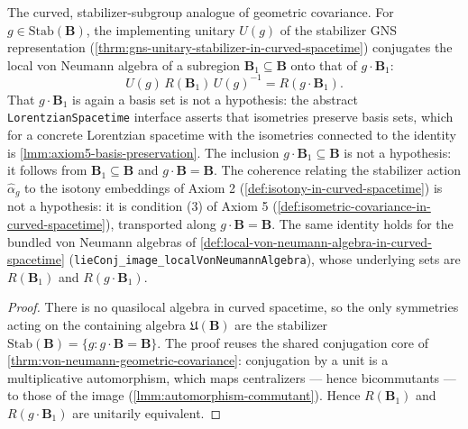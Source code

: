 \begin{theorem}
    \label{thrm:von-neumann-geometric-covariance-in-curved-spacetime}
    \leanok
    The curved, stabilizer-subgroup analogue of geometric covariance. For $g \in \mathrm{Stab}(\mathbf{B})$, the implementing unitary $U(g)$ of the stabilizer GNS representation (\ref{thrm:gns-unitary-stabilizer-in-curved-spacetime}) conjugates the local von Neumann algebra of a subregion $\mathbf{B}_1 \subseteq \mathbf{B}$ onto that of $g \cdot \mathbf{B}_1$:
    \[ U(g)\, R(\mathbf{B}_1)\, U(g)^{-1} = R(g \cdot \mathbf{B}_1). \]
    That $g \cdot \mathbf{B}_1$ is again a basis set is not a hypothesis: the abstract \texttt{LorentzianSpacetime} interface asserts that isometries preserve basis sets, which for a concrete Lorentzian spacetime with the isometries connected to the identity is \ref{lmm:axiom5-basis-preservation}. The inclusion $g \cdot \mathbf{B}_1 \subseteq \mathbf{B}$ is not a hypothesis: it follows from $\mathbf{B}_1 \subseteq \mathbf{B}$ and $g \cdot \mathbf{B} = \mathbf{B}$. The coherence relating the stabilizer action $\hat\alpha_g$ to the isotony embeddings of Axiom 2 (\ref{def:isotony-in-curved-spacetime}) is not a hypothesis: it is condition (3) of Axiom 5 (\ref{def:isometric-covariance-in-curved-spacetime}), transported along $g \cdot \mathbf{B} = \mathbf{B}$. The same identity holds for the bundled von Neumann algebras of \ref{def:local-von-neumann-algebra-in-curved-spacetime} (\texttt{lieConj\_image\_localVonNeumannAlgebra}), whose underlying sets are $R(\mathbf{B}_1)$ and $R(g \cdot \mathbf{B}_1)$.
\end{theorem}
\begin{proof}
    \leanok
    There is no quasilocal algebra in curved spacetime, so the only symmetries acting on the containing algebra $\mathfrak{U}(\mathbf{B})$ are the stabilizer $\mathrm{Stab}(\mathbf{B}) = \{g : g \cdot \mathbf{B} = \mathbf{B}\}$. The proof reuses the shared conjugation core of \ref{thrm:von-neumann-geometric-covariance}: conjugation by a unit is a multiplicative automorphism, which maps centralizers --- hence bicommutants --- to those of the image (\ref{lmm:automorphism-commutant}). Hence $R(\mathbf{B}_1)$ and $R(g \cdot \mathbf{B}_1)$ are unitarily equivalent.
\end{proof}

